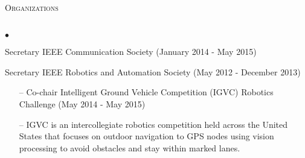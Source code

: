 \documentclass[11pt]{article}
\newcommand{\lineunder}{\vspace*{-8pt} \\ \hspace*{-18pt} \hrulefill \\}
\newcommand{\header}[1]{{\hspace*{-10pt}\vspace*{6pt} \textsc{#1}} \vspace*{-6pt} \lineunder}
\newenvironment{achievements}{\begin{list}{$\bullet$}{\topsep 0pt \itemsep -2pt}}{\vspace*{4pt}\end{list}}
\begin{document}
\header{Organizations}
\begin{achievements}
\item  Secretary IEEE Communication Society (January 2014 - May 2015)
\item Secretary IEEE Robotics and Automation Society (May 2012 - December 2013)
	\begin{enumerate}
		\item[--] Co-chair Intelligent Ground Vehicle Competition (IGVC) Robotics Challenge (May 2014 - May 2015)
        \item[--] IGVC is an intercollegiate robotics competition held across the United States that focuses on outdoor navigation to GPS nodes using vision processing to avoid obstacles and stay within marked lanes.
    \end{enumerate}
\end{achievements}
\end{document}
